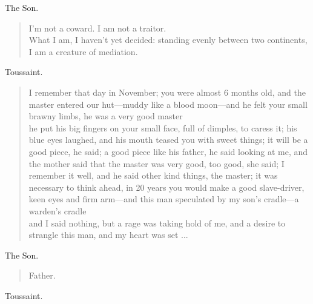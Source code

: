 \documentclass[letterpaper,article,12pt,oneside,notitlepage]{memoir}
\begin{document}
\begin{center}The Son.\end{center}

\begin{verse}
I'm not a coward. I am not a traitor. \\
What I am, I haven't yet decided: standing evenly between two continents, I am a creature of mediation.  \\
\end{verse}

\begin{center}Toussaint.\end{center}

\begin{verse}
\indent I remember that day in November; you were almost 6 months old, and the master entered our hut---muddy like a blood moon---and he felt your small brawny limbs, he was a very good master  \\
he put his big fingers on your small face, full of dimples, to caress it; his blue eyes laughed, and his mouth teased you with sweet things; it will be a good piece, he said; a good piece like his father, he said looking at me, and the mother said that the master was very good, too good, she said; I remember it well, and he said other kind things, the master; it was necessary to think ahead, in 20 years you would make a good slave-driver, keen eyes and firm arm---and this man speculated by my son's cradle---a warden's cradle  \\
and I said nothing, but a rage was taking hold of me, and a desire to strangle this man, and my heart was set ...  \\
\end{verse}

\begin{center}The Son.\end{center}

\begin{verse}
Father. \\
\end{verse}

\begin{center}Toussaint.\end{center}
\end{document}
